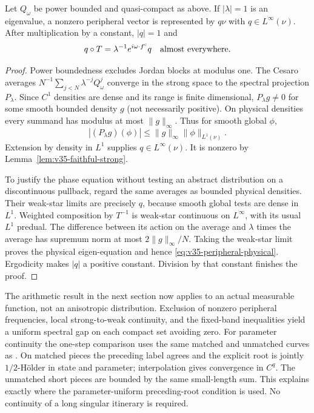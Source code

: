 \begin{lemma}
\label{lem:v35-peripheral-density}
Let $Q_\omega$ be power bounded and quasi-compact as above. If
$|\lambda|=1$ is an eigenvalue, a nonzero peripheral vector is represented
by $q\nu$ with $q\in L^\infty(\nu)$. After multiplication by a constant,
$|q|=1$ and
\begin{equation}\label{eq:v35-peripheral-physical}
 q\circ T=\lambda^{-1}e^{i\omega\cdot f^{\rm c}}q
                    \quad\hbox{almost everywhere}.
\end{equation}
\end{lemma}
\begin{proof}
Power boundedness excludes Jordan blocks at modulus one. The Cesaro
averages $N^{-1}\sum_{j<N}\lambda^{-j}Q_\omega^j$ converge in the strong
space to the spectral projection $P_\lambda$. Since $C^1$ densities
are dense and its range is finite dimensional, $P_\lambda g\ne0$ for
some smooth bounded density $g$ (not necessarily positive). On physical
densities every summand has modulus at most $\|g\|_\infty$. Thus for
smooth global $\phi$,
\[
 |(P_\lambda g)(\phi)|\le\|g\|_\infty\|\phi\|_{L^1(\nu)}.
\]
Extension by density in $L^1$ supplies $q\in L^\infty(\nu)$. It is
nonzero by Lemma~\ref{lem:v35-faithful-strong}.

To justify the phase equation without testing an abstract distribution
on a discontinuous pullback, regard the same averages as bounded
physical densities. Their weak-star limits are precisely $q$, because
smooth global tests are dense in $L^1$. Weighted composition by $T^{-1}$
is weak-star continuous on $L^\infty$, with its usual $L^1$ predual.
The difference between its action on the average and $\lambda$ times
the average has supremum norm at most $2\|g\|_\infty/N$. Taking the
weak-star limit proves the physical eigen-equation and hence
\eqref{eq:v35-peripheral-physical}. Ergodicity makes $|q|$ a positive
constant. Division by that constant finishes the proof.
\end{proof}

The arithmetic result in the next section now applies to an actual
measurable function, not an anisotropic distribution. Exclusion of
nonzero peripheral frequencies, local strong-to-weak continuity,
and the fixed-band inequalities yield a uniform spectral gap on each
compact set avoiding zero. For parameter continuity the one-step
comparison uses the same matched and unmatched curves as
\cite[Section 5]{DZ}. On matched pieces the preceding label agrees and
the explicit root is jointly $1/2$-H\"older in state and parameter;
interpolation gives convergence in $C^q$. The unmatched short pieces
are bounded by the same small-length sum. This explains exactly where
the parameter-uniform preceding-root condition is used. No continuity
of a long singular itinerary is required.
